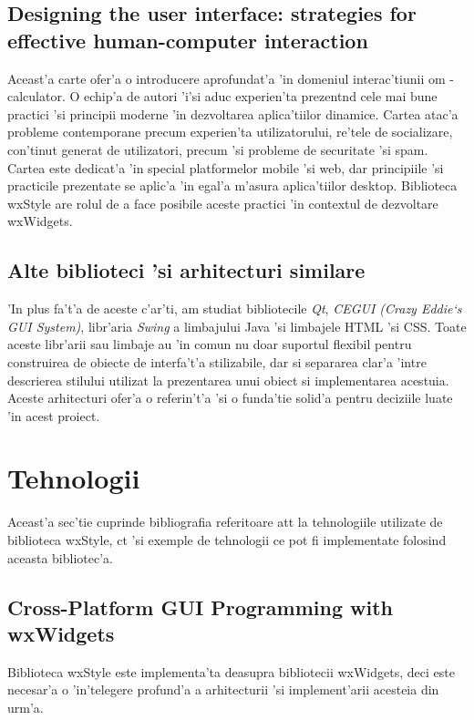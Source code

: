 \subsection{Designing the user interface: strategies for effective human-computer interaction}

Aceast'a carte ofer'a o introducere aprofundat'a 'in domeniul interac'tiunii om - calculator. O echip'a de autori 'i'si aduc experien'ta prezent{\ia}nd cele mai bune practici 'si principii moderne 'in dezvoltarea aplica'tiilor dinamice. Cartea atac'a probleme contemporane precum experien'ta utilizatorului, re'tele de socializare, con'tinut generat de utilizatori, precum 'si probleme de securitate 'si spam. Cartea este dedicat'a 'in special platformelor mobile 'si web, dar principiile 'si practicile prezentate se aplic'a 'in egal'a m'asura aplica'tiilor desktop. Biblioteca wxStyle are rolul de a face posibile aceste practici 'in contextul de dezvoltare wxWidgets.

\subsection{Alte biblioteci 'si arhitecturi similare}

'In plus fa't'a de aceste c'ar'ti, am studiat bibliotecile \emph{Qt}, \emph{CEGUI (Crazy Eddie`s GUI System)}, libr'aria \emph{Swing} a limbajului Java 'si limbajele HTML 'si CSS. Toate aceste libr'arii sau limbaje au 'in comun nu doar suportul flexibil pentru construirea de obiecte de interfa't'a stilizabile, dar si separarea clar'a 'intre descrierea stilului utilizat la prezentarea unui obiect si implementarea acestuia. Aceste arhitecturi ofer'a o referin't'a 'si o funda'tie solid'a pentru deciziile luate 'in acest proiect.

\section{Tehnologii}

Aceast'a sec'tie cuprinde bibliografia referitoare at{\ia}t la tehnologiile utilizate de biblioteca wxStyle, c{\ia}t 'si exemple de tehnologii ce pot fi implementate folosind aceasta bibliotec'a.

\subsection{Cross-Platform GUI Programming with wxWidgets}

Biblioteca wxStyle este implementa'ta deasupra bibliotecii wxWidgets, deci este necesar'a o 'in'telegere profund'a a arhitecturii 'si implement'arii acesteia din urm'a.

